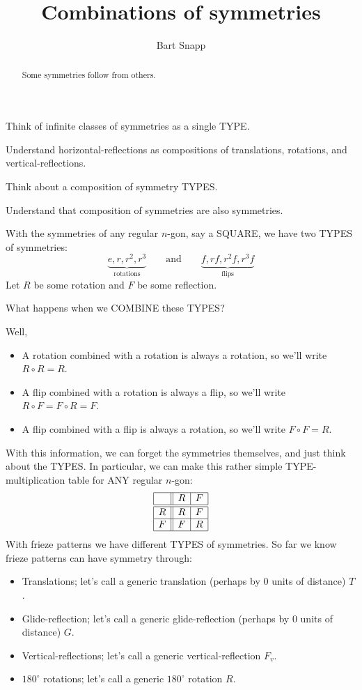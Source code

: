 \documentclass[noauthor,nooutcomes,hints,handout]{../ximera}
\author{Bart Snapp}
\title{Combinations of symmetries}
\begin{document}
\begin{abstract}
  Some symmetries follow from others. 
\end{abstract}
\maketitle

\begin{listOutcomes}
\item Think of infinite classes of symmetries as a single TYPE.
\item Understand horizontal-reflections as compositions of
  translations, rotations, and vertical-reflections.
\item Think about a composition of symmetry TYPES.
\item Understand that composition of symmetries are also symmetries.
\end{listOutcomes}


With the symmetries of any regular $n$-gon, say a SQUARE, we have two TYPES of symmetries:
\[
\underbrace{e,r,r^2,r^3}_{\text{rotations}} \qquad\text{and}\qquad \underbrace{f, rf,r^2f,r^3f}_{\text{flips}}
\]
Let $R$ be some rotation and $F$ be some reflection.
\begin{center}
  What happens when we COMBINE these TYPES?
\end{center}
Well,
\begin{itemize}
\item A rotation combined with a rotation is always a rotation, so we'll write $R \circ R = R$.
\item A flip combined with a rotation is always a flip, so we'll write
  $R\circ F = F \circ R = F$.
\item A flip combined with a flip is always a rotation, so we'll
  write $F\circ F = R$.
\end{itemize}
With this information, we can forget the symmetries themselves, and
just think about the TYPES. In particular, we can make this rather
simple TYPE-multiplication table for ANY regular $n$-gon:
\[
\begin{array}{|c||c|c|}
    \hline
       & R    & F    \\ \hline\hline
    R  & R    & F    \\ \hline
    F  & F    & R    \\ \hline
\end{array}
\]
With frieze patterns we have different TYPES of symmetries. So far we
know frieze patterns can have symmetry through:
\begin{itemize}
\item Translations; let's call a generic translation (perhaps by $0$ units of distance) $T$.
\item Glide-reflection; let's call a generic glide-reflection (perhaps by $0$ units of distance) $G$.
\item Vertical-reflections; let's call a generic vertical-reflection $F_v$.
\item $180^\circ$ rotations; let's call a generic $180^\circ$ rotation
  $R$.
\end{itemize}
\end{document}

